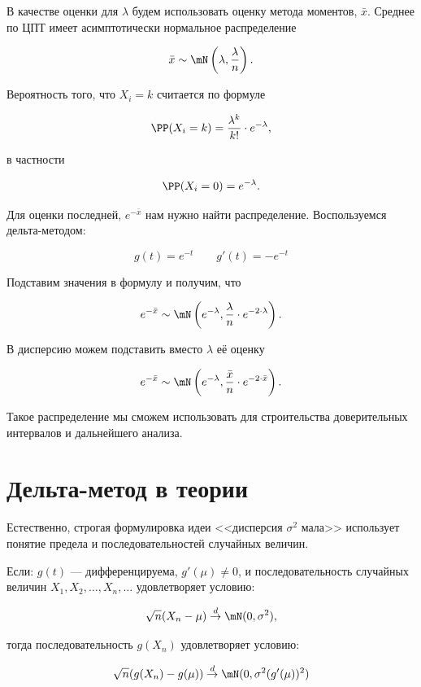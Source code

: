 \documentclass[12pt, a4paper, oneside]{article}
\begin{document}
\begin{sol}
В качестве оценки для $\lambda$ будем использовать оценку метода моментов, $\bar{x}$.  Среднее по ЦПТ имеет асимптотически нормальное распределение

$$
\bar{x}\sim \mN \left(\lambda, \frac{\lambda}{n} \right).
$$

Вероятность того, что $X_i = k$ считается по формуле 

$$
\PP(X_i = k) = \frac{\lambda^k}{k!} \cdot e^{-\lambda},
$$ 

в частности 

$$
\PP(X_i = 0) = e^{-\lambda}.
$$

Для оценки последней, $e^{-\bar{x}}$ нам нужно найти распределение. Воспользуемся  дельта-методом:

$$
g(t) = e^{-t} \qquad g'(t) = -e^{-t}
$$

Подставим значения в формулу и получим, что 

$$
e^{-\bar{x}} \sim \mN \left( e^{-\lambda},  \frac{\lambda}{n} \cdot e^{-2 \cdot \lambda}  \right).
$$

В дисперсию можем подставить вместо $\lambda$ её оценку

$$
e^{-\bar{x}} \sim \mN \left( e^{-\lambda},  \frac{\bar{x}}{n} \cdot e^{-2 \cdot \bar{x}}  \right).
$$

Такое распределение мы сможем использовать для строительства доверительных интервалов и дальнейшего анализа.
\end{sol}


\section*{Дельта-метод в теории}

Естественно, строгая формулировка идеи <<дисперсия $\sigma^2$ мала>> использует понятие предела и последовательностей случайных величин.

Если:  $g(t)$ --- дифференцируема, $g'(\mu)\neq 0$, и последовательность случайных величин $X_1, X_2, \ldots, X_n, \ldots $ удовлетворяет условию:

\[
\sqrt{n} (X_n - \mu) \overset{d}{\to}  \mN(0,\sigma^2),
\]

тогда последовательность $g(X_n)$ удовлетворяет условию:

\[
\sqrt{n} (g(X_n) - g(\mu)) \overset{d}{\to} \mN(0,\sigma^2 (g'(\mu))^2 )
\]
\end{document}
